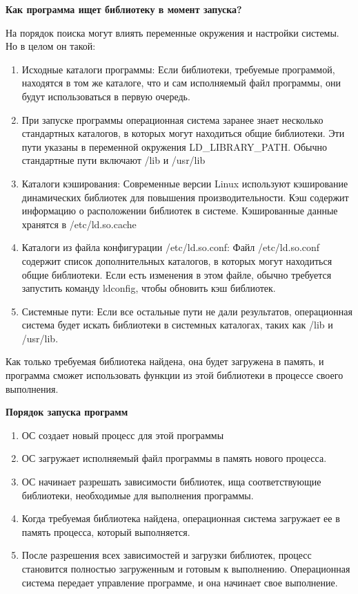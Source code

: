 \documentclass[oneside, final, 14pt]{extreport} %
\begin{document}
\vspace*{\baselineskip}

\textbf{Как программа ищет библиотеку в момент запуска?}

На порядок поиска могут влиять переменные окружения и настройки системы. Но в целом он такой:

\begin{enumerate}
    \item Исходные каталоги программы: Если библиотеки, требуемые программой, находятся в том же каталоге, что и сам исполняемый файл программы, они будут использоваться в первую очередь.
    \item При запуске программы операционная система заранее знает несколько стандартных каталогов, в которых могут находиться общие библиотеки. Эти пути указаны в переменной окружения LD\_LIBRARY\_PATH. Обычно стандартные пути включают /lib и /usr/lib
    \item Каталоги кэширования: Современные версии Linux используют кэширование динамических библиотек для повышения производительности. Кэш содержит информацию о расположении библиотек в системе. Кэшированные данные хранятся в /etc/ld.so.cache
    \item Каталоги из файла конфигурации /etc/ld.so.conf: Файл /etc/ld.so.conf содержит список дополнительных каталогов, в которых могут находиться общие библиотеки. Если есть изменения в этом файле, обычно требуется запустить команду ldconfig, чтобы обновить кэш библиотек.
    \item Системные пути: Если все остальные пути не дали результатов, операционная система будет искать библиотеки в системных каталогах, таких как /lib и /usr/lib.
\end{enumerate}

Как только требуемая библиотека найдена, она будет загружена в память, и программа сможет использовать функции из этой библиотеки в процессе своего выполнения.

\vspace*{\baselineskip}

\textbf{Порядок запуска программ}

\begin{enumerate}
    \item ОС создает новый процесс для этой программы
    \item ОС загружает исполняемый файл программы в память нового процесса.
    \item ОС начинает разрешать зависимости библиотек, ища соответствующие библиотеки, необходимые для выполнения программы.
    \item Когда требуемая библиотека найдена, операционная система загружает ее в память процесса, который выполняется.
    \item После разрешения всех зависимостей и загрузки библиотек, процесс становится полностью загруженным и готовым к выполнению. Операционная система передает управление программе, и она начинает свое выполнение.
\end{enumerate}
\end{document}
